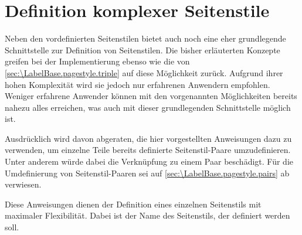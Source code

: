 \section{Definition komplexer Seitenstile}

\iffree{}{\enlargethispage{-.8\baselineskip}}%
Neben den vordefinierten Seitenstilen bietet  auch
noch eine eher grundlegende Schnittstelle zur Definition von Seitenstilen. Die
bisher erläuterten Konzepte greifen bei der Implementierung %
\iftrue ebenso wie die von \autoref{sec:\LabelBase.pagestyle.triple} \fi %
auf diese Möglichkeit zurück. %
\iftrue %
Aufgrund ihrer hohen Komplexität wird sie jedoch nur erfahrenen Anwendern
empfohlen. Weniger erfahrene Anwender können mit den vorgenannten
Möglichkeiten bereits nahezu alles erreichen, was auch mit dieser
grundlegenden Schnittstelle möglich ist. %
\else %
Sie ist jedoch hoch komplex und wird von Anwender nur sehr selten benötigt.
\fi

Ausdrücklich wird davon abgeraten, die hier vorgestellten Anweisungen dazu zu
verwenden, um einzelne Teile bereits definierte Seitenstil-Paare
umzudefinieren. Unter anderem würde dabei die Verknüpfung zu einem Paar
beschädigt. Für die Umdefinierung von Seitenstil-Paaren sei auf
\autoref{sec:\LabelBase.pagestyle.pairs} ab
 verwiesen.

\begin{Declaration}
\end{Declaration}
Diese Anweisungen dienen der Definition eines einzelnen Seitenstils mit
maximaler Flexibilität. Dabei ist  der Name des Seitenstils, der
definiert werden soll.

